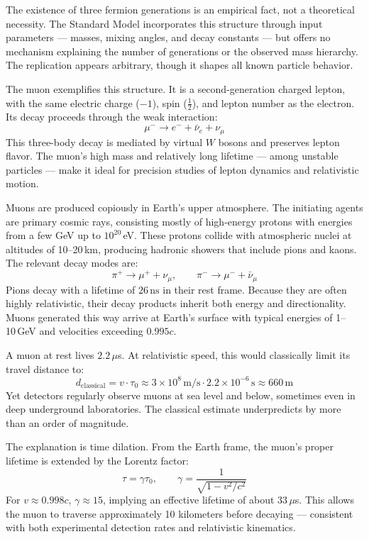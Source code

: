 The existence of three fermion generations is an empirical fact, not a theoretical necessity. The Standard Model incorporates this structure through input parameters — masses, mixing angles, and decay constants — but offers no mechanism explaining the number of generations or the observed mass hierarchy. The replication appears arbitrary, though it shapes all known particle behavior.

The muon exemplifies this structure. It is a second-generation charged lepton, with the same electric charge ($-1$), spin ($\tfrac{1}{2}$), and lepton number as the electron. Its decay proceeds through the weak interaction:
\[
\mu^- \rightarrow e^- + \bar{\nu}_e + \nu_\mu
\]
This three-body decay is mediated by virtual $W$ bosons and preserves lepton flavor. The muon's high mass and relatively long lifetime — among unstable particles — make it ideal for precision studies of lepton dynamics and relativistic motion.

Muons are produced copiously in Earth’s upper atmosphere. The initiating agents are primary cosmic rays, consisting mostly of high-energy protons with energies from a few GeV up to $10^{20}$ eV. These protons collide with atmospheric nuclei at altitudes of 10–20 km, producing hadronic showers that include pions and kaons. The relevant decay modes are:
\[
\pi^+ \rightarrow \mu^+ + \nu_\mu, \qquad \pi^- \rightarrow \mu^- + \bar{\nu}_\mu
\]
Pions decay with a lifetime of $26\,\text{ns}$ in their rest frame. Because they are often highly relativistic, their decay products inherit both energy and directionality. Muons generated this way arrive at Earth’s surface with typical energies of 1–10 GeV and velocities exceeding $0.995c$.

A muon at rest lives $2.2\,\mu$s. At relativistic speed, this would classically limit its travel distance to:
\[
d_{\text{classical}} = v \cdot \tau_0 \approx 3 \times 10^8\,\text{m/s} \cdot 2.2 \times 10^{-6}\,\text{s} \approx 660\,\text{m}
\]
Yet detectors regularly observe muons at sea level and below, sometimes even in deep underground laboratories. The classical estimate underpredicts by more than an order of magnitude.

The explanation is time dilation. From the Earth frame, the muon's proper lifetime is extended by the Lorentz factor:
\[
\tau = \gamma \tau_0, \qquad \gamma = \frac{1}{\sqrt{1 - v^2/c^2}}
\]
For $v \approx 0.998c$, $\gamma \approx 15$, implying an effective lifetime of about $33\,\mu$s. This allows the muon to traverse approximately 10 kilometers before decaying — consistent with both experimental detection rates and relativistic kinematics.

